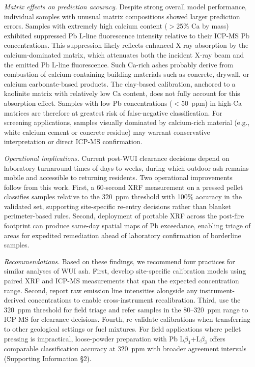 \documentclass[
  journal=esthag,        %
  manuscript=article,    %
  layout=onecolumn       %
]{achemso}
\begin{document}
\textit{Matrix effects on prediction accuracy.}
Despite strong overall model performance, individual samples with unusual matrix compositions showed larger prediction errors. Samples with extremely high calcium content ($>$25\% Ca by mass) exhibited suppressed Pb L-line fluorescence intensity relative to their ICP-MS Pb concentrations. This suppression likely reflects enhanced X-ray absorption by the calcium-dominated matrix, which attenuates both the incident X-ray beam and the emitted Pb L-line fluorescence. Such Ca-rich ashes probably derive from combustion of calcium-containing building materials such as concrete, drywall, or calcium carbonate-based products. The clay-based calibration, anchored to a kaolinite matrix with relatively low Ca content, does not fully account for this absorption effect. Samples with low Pb concentrations ($<$50~ppm) in high-Ca matrices are therefore at greatest risk of false-negative classification. For screening applications, samples visually dominated by calcium-rich material (e.g., white calcium cement or concrete residue) may warrant conservative interpretation or direct ICP-MS confirmation.

\textit{Operational implications.}
Current post-WUI clearance decisions depend on laboratory turnaround times of days to weeks, during which outdoor ash remains mobile and accessible to returning residents. Two operational improvements follow from this work. First, a 60-second XRF measurement on a pressed pellet classifies samples relative to the 320~ppm threshold with 100\% accuracy in the validated set, supporting site-specific re-entry decisions rather than blanket perimeter-based rules. Second, deployment of portable XRF across the post-fire footprint can produce same-day spatial maps of Pb exceedance, enabling triage of areas for expedited remediation ahead of laboratory confirmation of borderline samples.

\textit{Recommendations.}
Based on these findings, we recommend four practices for similar analyses of WUI ash. First, develop site-specific calibration models using paired XRF and ICP-MS measurements that span the expected concentration range. Second, report raw emission line intensities alongside any instrument-derived concentrations to enable cross-instrument recalibration. Third, use the 320~ppm threshold for field triage and refer samples in the 80--320~ppm range to ICP-MS for clearance decisions. Fourth, re-validate calibrations when transferring to other geological settings or fuel mixtures. For field applications where pellet pressing is impractical, loose-powder preparation with Pb L$\beta_1$+L$\beta_3$ offers comparable classification accuracy at 320~ppm with broader agreement intervals (Supporting Information \S 2).
\end{document}
